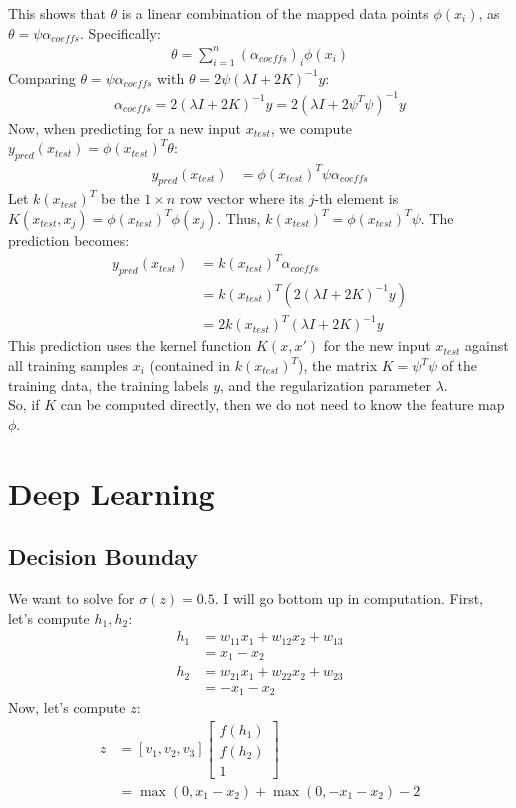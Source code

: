 \documentclass[a4paper]{article}
\begin{document}
This shows that $\theta$ is a linear combination of the mapped data points $\phi(x_i)$, as $\theta = \psi \alpha_{coeffs}$. Specifically:
\begin{align*}
    \theta = \sum_{i=1}^n (\alpha_{coeffs})_i \phi(x_i)
\end{align*}
Comparing $\theta = \psi \alpha_{coeffs}$ with $\theta = 2\psi (\lambda I + 2K)^{-1} y$:
\begin{align*}
    \alpha_{coeffs} = 2(\lambda I + 2K)^{-1} y = 2(\lambda I + 2\psi^T\psi)^{-1} y
\end{align*}
Now, when predicting for a new input $x_{test}$, we compute $y_{pred}(x_{test}) = \phi(x_{test})^T \theta$:
\begin{align*}
    y_{pred}(x_{test}) &= \phi(x_{test})^T \psi \alpha_{coeffs}
\end{align*}
Let $k(x_{test})^T$ be the $1 \times n$ row vector where its $j$-th element is $K(x_{test}, x_j) = \phi(x_{test})^T \phi(x_j)$. Thus, $k(x_{test})^T = \phi(x_{test})^T \psi$.
The prediction becomes:
\begin{align*}
    y_{pred}(x_{test}) &= k(x_{test})^T \alpha_{coeffs} \\
    &= k(x_{test})^T \left( 2(\lambda I + 2K)^{-1} y \right) \\
    &= 2 k(x_{test})^T (\lambda I + 2K)^{-1} y
\end{align*}
This prediction uses the kernel function $K(x, x')$ for the new input $x_{test}$ against all training samples $x_i$ (contained in $k(x_{test})^T$), the matrix $K = \psi^T\psi$ of the training data, the training labels $y$, and the regularization parameter $\lambda$.\\

So, if $K$ can be computed directly, then we do not need to know the feature map $\phi$.

\newpage

\section{Deep Learning}

\subsection{Decision Bounday}

We want to solve for $\sigma(z) = 0.5$. I will go bottom up in computation. First, let's compute $h_1, h_2$:
\begin{align*}
h_1 &= w_{11}x_1 + w_{12}x_2 + w_{13}\\
&= x_1 - x_2\\
h_2 &= w_{21}x_1 + w_{22}x_2 + w_{23}\\
&= - x_1 - x_2
\end{align*}
Now, let's compute $z$:
\begin{align*}
z &= [v_1, v_2, v_3] \begin{bmatrix}
    f(h_1)\\
    f(h_2)\\
    1
\end{bmatrix}\\
&= \max(0, x_1 - x_2) + \max(0, -x_1 - x_2) - 2
\end{align*}
\end{document}
